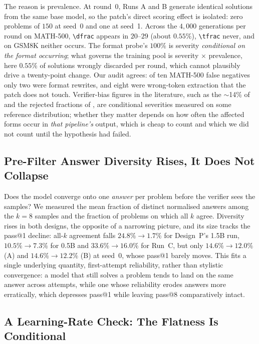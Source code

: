 \documentclass[runningheads]{llncs}
\begin{document}
The reason is prevalence. At round~0, Runs A and B generate identical solutions
from the same base model, so the patch's direct scoring effect is isolated: zero
problems of $150$ at seed~0 and one at seed~1. Across the $4{,}000$ generations
per round on MATH-500, \verb|\dfrac| appears in $20$--$29$ (about $0.55\%$),
\verb|\tfrac| never, and on GSM8K neither occurs. The format probe's $100\%$ is
severity \emph{conditional on the format occurring}; what governs the training
pool is severity $\times$ prevalence, here $0.55\%$ of solutions wrongly
discarded per round, which cannot plausibly drive a twenty-point change. Our
audit agrees: of ten MATH-500 false negatives only two were format rewrites, and
eight were wrong-token extraction that the patch does not touch.
Verifier-bias figures in the literature, such as the $\sim$14\% of
\cite{ref_robustness} and the rejected fractions of \cite{ref_tinyv}, are
conditional severities measured on some reference distribution; whether they
matter depends on how often the affected forms occur in \emph{that pipeline's}
output, which is cheap to count and which we did not count until the hypothesis
had failed.

\subsection{Pre-Filter Answer Diversity Rises, It Does Not Collapse}
\label{sec:answer-diversity}

Does the model converge onto one \emph{answer} per problem before the verifier
sees the samples? We measured the mean fraction of distinct normalised answers
among the $k=8$ samples and the fraction of problems on which all $k$ agree.
Diversity rises in both designs, the opposite of a narrowing picture, and its
size tracks the pass@1 decline: all-$k$ agreement falls $24.8\%\to1.7\%$ for
Design~P's 1.5B run, $10.5\%\to7.3\%$ for 0.5B and $33.6\%\to16.0\%$ for Run~C,
but only $14.6\%\to12.0\%$ (A) and $14.6\%\to12.2\%$ (B) at seed~0, whose pass@1
barely moves. This fits a single underlying quantity, first-attempt reliability,
rather than stylistic convergence: a model that still solves a problem tends to
land on the same answer across attempts, while one whose reliability erodes
answers more erratically, which depresses pass@1 while leaving pass@8
comparatively intact.

\subsection{A Learning-Rate Check: The Flatness Is Conditional}
\label{sec:lrcheck}
\end{document}
